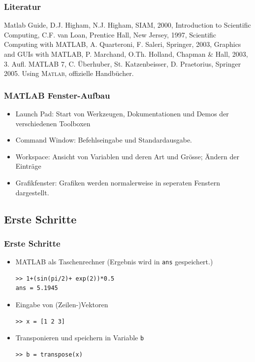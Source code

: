 \begin{frame}[fragile]\frametitle{Literatur}
\begin{thebibliography}{10}
\small
{}
\alert{Matlab Guide}, D.J. Higham, N.J. Higham, SIAM, 2000, 
 \alert{Introduction to Scientific Computing}, C.F. van Loan, Prentice Hall,
New Jersey, 1997,
 \alert{Scientific Computing with MATLAB}, A. Quarteroni, F. Saleri, Springer, 2003,
 \alert{Graphics and GUIs with MATLAB}, P. Marchand, O.Th. Holland, Chapman \& Hall, 2003, 3. Aufl.
 \alert{MATLAB 7}, C. \"Uberhuber, St. Katzenbeisser, D. Praetorius, Springer 2005.
 \alert {Using \textsc{Matlab}}, offizielle Handbücher.
\end{thebibliography}
\end{frame}


\begin{frame}[fragile]\frametitle{MATLAB Fenster-Aufbau}
\begin{itemize}
\item \alert{Launch Pad:} Start von Werkzeugen, Dokumentationen
und Demos der verschiedenen Toolboxen 
\item \alert{Command Window:} Befehlseingabe und Standardausgabe.
\item \alert{Workspace:} Ansicht von Variablen und deren Art und Grösse; Ändern der
Einträge 
\item \alert{Grafikfenster:} Grafiken werden normalerweise in seperaten Fenstern dargestellt.
\end{itemize}
\end{frame}

\subsection{Erste Schritte}
\begin{frame}[fragile]\frametitle{Erste Schritte}
\begin{itemize}
\item MATLAB als Taschenrechner \newline (Ergebnis wird in \lstinline!ans! gespeichert.) 
\begin{lstlisting}
>> 1+(sin(pi/2)+ exp(2))*0.5
ans = 5.1945
\end{lstlisting}
\item Eingabe von (Zeilen-)Vektoren
\begin{lstlisting}
>> x = [1 2 3]  
\end{lstlisting}
\item Transponieren und speichern in  Variable \lstinline!b!
\begin{lstlisting}
>> b = transpose(x)
\end{lstlisting}
\end{itemize}
\end{frame}

